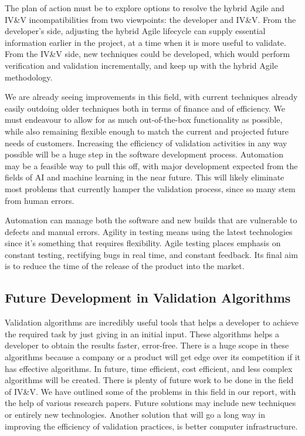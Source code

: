 \documentclass[journal, onecolumn]{IEEEtran}
\begin{document}
	The plan of action must be to explore options to resolve the hybrid Agile and IV\&V incompatibilities from two viewpoints: the developer and IV\&V. From the developer’s side, adjusting the hybrid Agile lifecycle can supply essential information earlier in the project, at a time when it is more useful to validate. From the IV\&V side, new techniques could be developed, which would perform verification and validation incrementally, and keep up with the hybrid Agile methodology.
	
	We are already seeing improvements in this field, with current techniques already easily outdoing older techniques both in terms of finance and of efficiency. We must endeavour to allow for as much out-of-the-box functionality as possible, while also remaining flexible enough to match the current and projected future needs of customers. Increasing the efficiency of validation activities in any way possible will be a huge step in the software development process. Automation may be a feasible way to pull this off, with major development expected from the fields of AI and machine learning in the near future. This will likely eliminate most problems that currently hamper the validation process, since so many stem from human errors.
	
	Automation can manage both the software and new builds that are vulnerable to defects and manual errors. Agility in testing means using the latest technologies since it’s something that requires flexibility. Agile testing places emphasis on constant testing, rectifying bugs in real time, and constant feedback. Its final aim is to reduce the time of the release of the product into the market.
	
	\subsection{Future Development in Validation Algorithms}
	Validation algorithms are incredibly useful tools that helps a developer to achieve the required task by just giving in an initial input. These algorithms helps a developer to obtain the results faster, error-free. There is a huge scope in these algorithms because a company or a product will get edge over its competition if it has effective algorithms. 
	\newline\newline
	In future, time efficient, cost efficient, and less complex algorithms will be created.
	\bigskip
	There is plenty of future work to be done in the field of IV\&V. We have outlined some of the problems in this field in our report, with the help of various research papers. Future solutions may include new techniques or entirely new technologies. Another solution that will go a long way in improving the efficiency of validation practices, is better computer infrastructure.
	\bigskip
\end{document}
